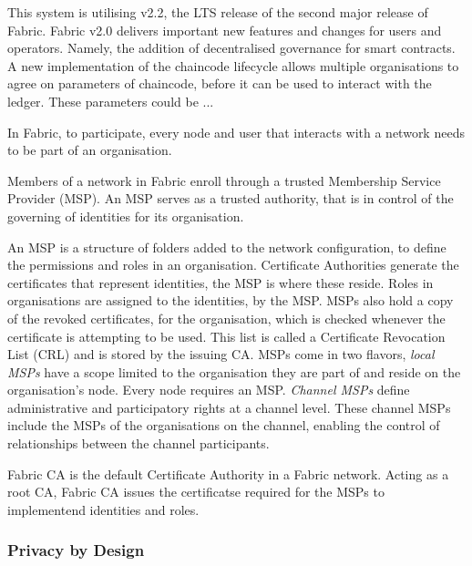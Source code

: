 This system is utilising v2.2, the LTS release of the second major release of Fabric. 
Fabric v2.0 delivers important new features and changes for users and operators. %
Namely, the addition of decentralised governance for smart contracts. 
A new implementation of the chaincode lifecycle allows multiple organisations to agree on parameters of chaincode, before it can be used to interact with the ledger. 
These parameters could be ... %
\cite{noauthor_whats_nodate}

In Fabric, to participate, every node and user that interacts with a network needs to be part of an organisation. \cite{noauthor_using_nodate}

Members of a network in Fabric enroll through a trusted Membership Service Provider (MSP). \cite{noauthor_introduction_nodate}
An MSP serves as a trusted authority, that is in control of the governing of identities for its organisation. 

An MSP is a structure of folders added to the network configuration, to define the permissions and roles in an organisation. 
Certificate Authorities generate the certificates that represent identities, the MSP is where these reside. 
Roles in organisations are assigned to the identities, by the MSP. 
MSPs also hold a copy of the revoked certificates, for the organisation, which is checked whenever the certificate is attempting to be used. \cite{noauthor_membership_nodate}
This list is called a Certificate Revocation List (CRL) \cite{cooper_internet_nodate} and is stored by the issuing CA. \cite{noauthor_identity_nodate}
MSPs come in two flavors, \emph{local MSPs} have a scope limited to the organisation they are part of and reside on the organisation's node. Every node requires an MSP.
\emph{Channel MSPs} define administrative and participatory rights at a channel level. These channel MSPs include the MSPs of the organisations on the channel, enabling the control of relationships between the channel participants. \cite{noauthor_membership_nodate}

Fabric CA is the default Certificate Authority in a Fabric network. Acting as a root CA, Fabric CA issues the certificatse required for the MSPs to implementend identities and roles. \cite{noauthor_identity_nodate}


\subsubsection{Privacy by Design}

